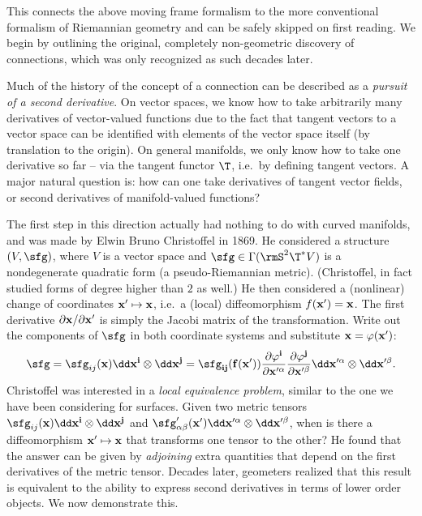 This \subsect connects the above moving frame formalism to the more conventional formalism of Riemannian geometry and can be safely skipped on first reading. We begin by outlining the original, completely non-geometric discovery of connections, which was only recognized as such decades later.


\begin{rem}
    Much of the history of the concept of a connection can be described as a \emph{pursuit of a second derivative}. On vector spaces, we know how to take arbitrarily many derivatives of vector-valued functions due to the fact that tangent vectors to a vector space can be identified with elements of the vector space itself (by translation to the origin). On general manifolds, we only know how to take one derivative so far -- via the tangent functor $\T$, i.e.\ by defining tangent vectors. A major natural question is: how can one take derivatives of tangent vector fields, or second derivatives of manifold-valued functions?

    The first step in this direction actually had nothing to do with curved manifolds, and was made by Elwin Bruno Christoffel in 1869. He considered a structure $(V,\sfg)$, where $V$ is a vector space and $\sfg\in \Gamma(\rmS^2 \T^\ast V)$ is a nondegenerate quadratic form (a pseudo-Riemannian metric). (Christoffel, in fact studied forms of degree higher than $2$ as well.) He then considered a (nonlinear) change of coordinates $\bf{x}'\mapsto \bf{x}$, i.e.\ a (local) diffeomorphism $f(\bf{x}')=\bf{x}$. The first derivative $\partial\bf{x}\slash \partial\bf{x}'$ is simply the Jacobi matrix of the transformation. Write out the components of $\sfg$ in both coordinate systems and substitute $\bf{x}=\varphi(\bf{x}')$:
    \[\sfg=\sfg_{ij}(\bf{x})\dd x^i\otimes \dd x^j=\sfg_{ij}(f(\bf{x'}))\frac{\partial \varphi^i}{\partial x^{\prime \alpha}}\frac{\partial \varphi^j}{\partial x^{\prime \beta}}\dd x^{\prime\alpha}\otimes \dd x^{\prime\beta}.\label{eq 1215}\]
    Christoffel was interested in a \emph{local equivalence problem}, similar to the one we have been considering for surfaces. Given two metric tensors $\sfg_{ij}(\bf{x})\dd x^i\otimes \dd x^j$ and $\sfg'_{\alpha\beta}(\bf{x}')\dd x^{\prime\alpha}\otimes \dd x^{\prime\beta}$, when is there a diffeomorphism $\bf{x}'\mapsto \bf{x}$ that transforms one tensor to the other? He found that the answer can be given by \emph{adjoining} extra quantities that depend on the first derivatives of the metric tensor. Decades later, geometers realized that this result is equivalent to the ability to express second derivatives in terms of lower order objects. We now demonstrate this.


\end{rem}
